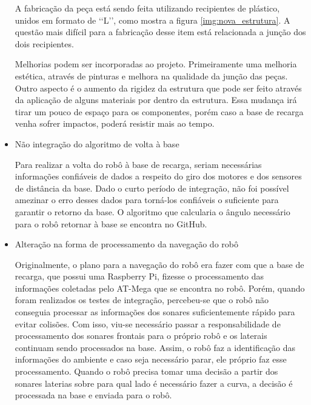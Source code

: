 \begin{itemize}
        A fabricação da peça está sendo feita utilizando recipientes de plástico, unidos em formato de \lq\lq L\rq\rq, como mostra a figura \ref{img:nova_estrutura}. A questão mais difícil para a fabricação desse item está relacionada a junção dos dois recipientes.

        Melhorias podem ser incorporadas ao projeto. Primeiramente uma melhoria estética, através de pinturas e melhora na qualidade da junção das peças. Outro aspecto é o aumento da rigidez da estrutura que pode ser feito através da aplicação de alguns materiais por dentro da estrutura. Essa mudança irá tirar um pouco de espaço para os componentes, porém caso a base de recarga venha sofrer impactos, poderá resistir mais ao tempo.

      \item Não integração do algoritmo de volta à base

      Para realizar a volta do robô à base de recarga, seriam necessárias informações confiáveis de dados a respeito do giro dos motores e dos sensores de distância da base. Dado o curto período de integração, não foi possível amezinar o erro desses dados para torná-los confiáveis o suficiente para garantir o retorno da base. O algoritmo que calcularia o ângulo necessário para o robô retornar à base se encontra no GitHub.

      \item Alteração na forma de processamento da navegação do robô

      Originalmente, o plano para a navegação do robô era fazer com que a base de recarga, que possui uma Raspberry Pi, fizesse o processamento das informações coletadas pelo AT-Mega que se encontra no robô. Porém, quando foram realizados os testes de integração, percebeu-se que o robô não conseguia processar as informações dos sonares suficientemente rápido para evitar colisões. Com isso, viu-se necessário passar a responsabilidade de processamento dos sonares frontais para o próprio robô e os laterais continuam sendo processados na base. Assim, o robô faz a identificação das informações do ambiente e caso seja necessário parar, ele próprio faz esse processamento. Quando o robô precisa tomar uma decisão a partir dos sonares laterias sobre para qual lado é necessário fazer a curva, a decisão é processada na base e enviada para o robô.

   \end{itemize}
 		

